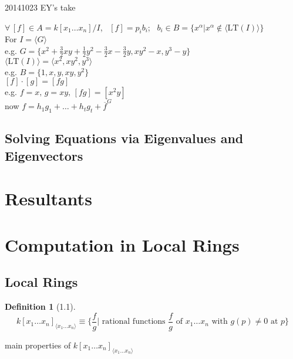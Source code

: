 \documentclass[10pt]{amsart}
\newtheorem{definition}{Definition}
\begin{document}
\begin{multicols*}{2}
20141023 EY's take

$\forall \, [f] \in A = k[x_1 \dots x_n]/I$, \, $[f] = p_ib_i$; \, $b_i \in B = \lbrace x^{\alpha} | x^{\alpha} \notin \langle \text{LT}(I) \rangle \rbrace$ \\
For $I = \langle G \rangle$ \\
\phantom{\quad } e.g. $G=\lbrace x^2 + \frac{3}{2} xy + \frac{1}{2} y^2 - \frac{3}{2} x - \frac{3}{2} y, xy^2-x, y^3-y \rbrace$ \\
$\langle \text{LT}(I) \rangle = \langle x^2, xy^2,y^3 \rangle$ \\
e.g. $B=\lbrace 1,x,y,xy,y^2\rbrace$ \\
\phantom{\quad } $[f]\cdot[g] = [fg]$ \\
e.g. $f=x, \, g=xy, \, [fg] = [x^2y]$ \\
now $f=h_1g_1 + \dots +h_tg_t+ \overline{f}^G$

\subsection{}

\subsection{Solving Equations via Eigenvalues and Eigenvectors}


\section{ Resultants }

\section{Computation in Local Rings}

\subsection{Local Rings}


\begin{definition}[1.1]
  \[
k[x_1 \dots x_n]_{\langle x_1 \dots x_n \rangle} \equiv \lbrace \frac{f}{g} | \text{ rational functions } \frac{f}{g} \text{ of } x_1 \dots x_n \text{ with } g(p) \neq 0 \text{ at } p \rbrace
\]
\end{definition}

main properties of $k[x_1 \dots x_n]_{\langle x_1 \dots x_n \rangle }$


\end{multicols*}
\end{document}
